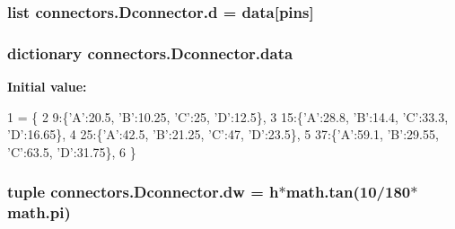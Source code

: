 \subsubsection[{d}]{\setlength{\rightskip}{0pt plus 5cm}list connectors.\+Dconnector.\+d = {\bf data}\mbox{[}{\bf pins}\mbox{]}\hspace{0.3cm}{\ttfamily [static]}}\label{classconnectors_1_1_dconnector_af4b9dd5f33e2080e36f536cdad5b5a6c}
\hypertarget{classconnectors_1_1_dconnector_a84cb1f3d8a72e078a564368af8639966}{}
\subsubsection[{data}]{\setlength{\rightskip}{0pt plus 5cm}dictionary connectors.\+Dconnector.\+data\hspace{0.3cm}{\ttfamily [static]}}\label{classconnectors_1_1_dconnector_a84cb1f3d8a72e078a564368af8639966}
{\bfseries Initial value\+:}
\begin{DoxyCode}
1 = \{
2             9:\{\textcolor{stringliteral}{'A'}:20.5, \textcolor{stringliteral}{'B'}:10.25, \textcolor{stringliteral}{'C'}:25, \textcolor{stringliteral}{'D'}:12.5\},
3             15:\{\textcolor{stringliteral}{'A'}:28.8, \textcolor{stringliteral}{'B'}:14.4, \textcolor{stringliteral}{'C'}:33.3, \textcolor{stringliteral}{'D'}:16.65\},
4             25:\{\textcolor{stringliteral}{'A'}:42.5, \textcolor{stringliteral}{'B'}:21.25, \textcolor{stringliteral}{'C'}:47, \textcolor{stringliteral}{'D'}:23.5\},
5             37:\{\textcolor{stringliteral}{'A'}:59.1, \textcolor{stringliteral}{'B'}:29.55, \textcolor{stringliteral}{'C'}:63.5, \textcolor{stringliteral}{'D'}:31.75\},
6         \}
\end{DoxyCode}
\hypertarget{classconnectors_1_1_dconnector_a476e7ddc59901adb338df0ddd6a4331b}{}
\subsubsection[{dw}]{\setlength{\rightskip}{0pt plus 5cm}tuple connectors.\+Dconnector.\+dw = {\bf h}$\ast$math.\+tan(10/180$\ast$math.\+pi)\hspace{0.3cm}{\ttfamily [static]}}\label{classconnectors_1_1_dconnector_a476e7ddc59901adb338df0ddd6a4331b}
\hypertarget{classconnectors_1_1_dconnector_a9b48f02a0e0c0e7e70385d7ed9afe5e2}{}
